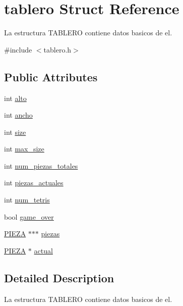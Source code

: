 \hypertarget{structtablero}{}\section{tablero Struct Reference}
\label{structtablero}


La estructura T\+A\+B\+L\+E\+RO contiene datos basicos de el.  




{\ttfamily \#include $<$tablero.\+h$>$}

\subsection*{Public Attributes}
\begin{DoxyCompactItemize}
\item 
int \hyperlink{structtablero_a02dc616234909717fced91fc61e374d1}{alto}
\item 
int \hyperlink{structtablero_a7080955f58062103097ff1278118634c}{ancho}
\item 
int \hyperlink{structtablero_aa9bfe1c2bcb2523f1857ac6ad0ede0aa}{size}
\item 
int \hyperlink{structtablero_a9c533b92c8f862bf921f4d1011f01599}{max\+\_\+size}
\item 
int \hyperlink{structtablero_a2ee1e90ac1b8c4b7d5bf99066da856b9}{num\+\_\+piezas\+\_\+totales}
\item 
int \hyperlink{structtablero_afae3a3203985d0fe80570051832b3e04}{piezas\+\_\+actuales}
\item 
int \hyperlink{structtablero_a840da43b4c79754ed941a715e18fa52c}{num\+\_\+tetris}
\item 
bool \hyperlink{structtablero_a227632399d4dce805bc16668cb1d72ea}{game\+\_\+over}
\item 
\hyperlink{pieza_8h_aac4b603fd85c8ae53529fc00a88de8ae}{P\+I\+E\+ZA} $\ast$$\ast$$\ast$ \hyperlink{structtablero_a7f2c766900f894561abf23f3fc34662b}{piezas}
\item 
\hyperlink{pieza_8h_aac4b603fd85c8ae53529fc00a88de8ae}{P\+I\+E\+ZA} $\ast$ \hyperlink{structtablero_a337ac84c79ee614ce0477c8996991a4c}{actual}
\end{DoxyCompactItemize}


\subsection{Detailed Description}
La estructura T\+A\+B\+L\+E\+RO contiene datos basicos de el. 

